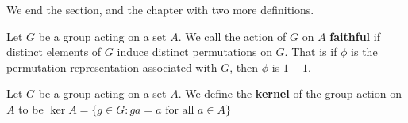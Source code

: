We end the section, and the chapter with two more definitions.

\begin{definition}
    Let $G$ be a group acting on a set $A$. We call the action of $G$ on  $A$
     \textbf{faithful} if distinct elements of $G$ induce distinct permutations
     on  $G$. That is if $\phi$ is the permutation representation associated
     with  $G$, then  $\phi$ is  $1-1$.
\end{definition}

\begin{definition}
    Let $G$ be a group acting on a set $A$. We define the \textbf{kernel} of the
    group action on $A$ to be  $\ker{A}=\{g \in G : ga=a \text{ for all } a \in
    A\}$
\end{definition}
